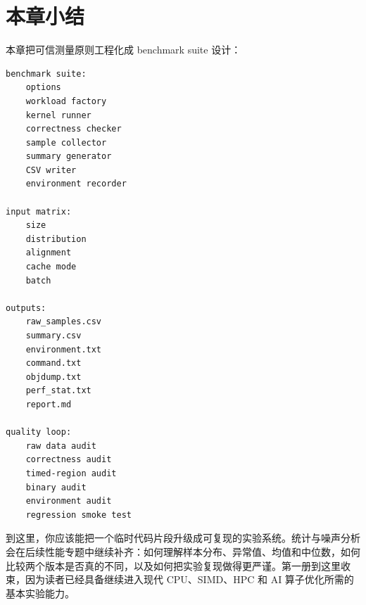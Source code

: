 \section{本章小结}

本章把可信测量原则工程化成 benchmark suite 设计：

\begin{lstlisting}
benchmark suite:
    options
    workload factory
    kernel runner
    correctness checker
    sample collector
    summary generator
    CSV writer
    environment recorder

input matrix:
    size
    distribution
    alignment
    cache mode
    batch

outputs:
    raw_samples.csv
    summary.csv
    environment.txt
    command.txt
    objdump.txt
    perf_stat.txt
    report.md

quality loop:
    raw data audit
    correctness audit
    timed-region audit
    binary audit
    environment audit
    regression smoke test
\end{lstlisting}

到这里，你应该能把一个临时代码片段升级成可复现的实验系统。统计与噪声分析会在后续性能专题中继续补齐：如何理解样本分布、异常值、均值和中位数，如何比较两个版本是否真的不同，以及如何把实验复现做得更严谨。第一册到这里收束，因为读者已经具备继续进入现代 CPU、SIMD、HPC 和 AI 算子优化所需的基本实验能力。
